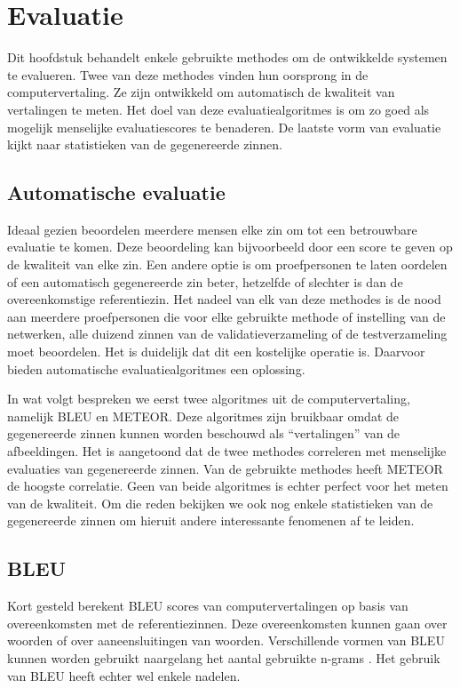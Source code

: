 \chapter{Evaluatie}
\label{hoofdstuk:evaluatie}
Dit hoofdstuk behandelt enkele gebruikte methodes om de ontwikkelde systemen te evalueren. Twee van deze methodes vinden hun oorsprong in de computervertaling. Ze zijn ontwikkeld om automatisch de kwaliteit van vertalingen te meten. Het doel van deze evaluatiealgoritmes is om zo goed als mogelijk menselijke evaluatiescores te benaderen. De laatste vorm van evaluatie kijkt naar statistieken van de gegenereerde zinnen.


\section{Automatische evaluatie}
Ideaal gezien beoordelen meerdere mensen elke zin om tot een betrouwbare evaluatie te komen. Deze beoordeling kan bijvoorbeeld door een score te geven op de kwaliteit van elke zin. Een andere optie is om proefpersonen te laten oordelen of een automatisch gegenereerde zin beter, hetzelfde of slechter is dan de overeenkomstige referentiezin. Het nadeel van elk van deze methodes is de nood aan meerdere proefpersonen die voor elke gebruikte methode of instelling van de netwerken, alle duizend zinnen van de validatieverzameling of de testverzameling moet beoordelen. Het is duidelijk dat dit een kostelijke operatie is. Daarvoor bieden automatische evaluatiealgoritmes een oplossing.

In wat volgt bespreken we eerst twee algoritmes uit de computervertaling, namelijk BLEU en METEOR.  Deze algoritmes zijn bruikbaar omdat de gegenereerde zinnen kunnen worden beschouwd als ``vertalingen'' van de afbeeldingen. Het is aangetoond dat de twee methodes correleren met menselijke evaluaties van gegenereerde zinnen. Van de gebruikte methodes heeft METEOR de hoogste correlatie. 
Geen van beide algoritmes is echter perfect voor het meten van de kwaliteit.
Om die reden bekijken we ook nog enkele statistieken van de gegenereerde zinnen om hieruit andere interessante fenomenen af te leiden.

\section{BLEU}
Kort gesteld berekent BLEU scores van computervertalingen op basis van overeenkomsten met de referentiezinnen. Deze overeenkomsten kunnen gaan over woorden of over aaneensluitingen van woorden. Verschillende vormen van BLEU kunnen worden gebruikt naargelang het aantal gebruikte n-grams . Het gebruik van BLEU heeft echter wel enkele nadelen.

